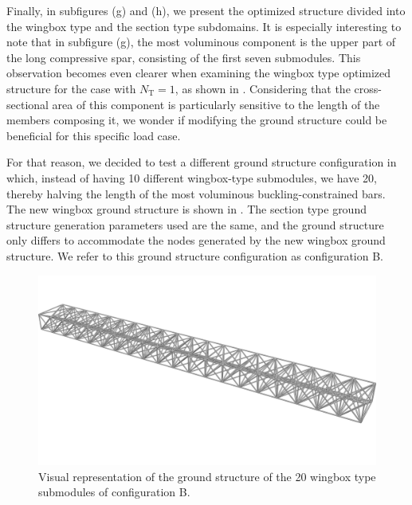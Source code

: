 Finally, in subfigures (g) and (h), we present the optimized structure divided into the wingbox type and the section type subdomains. It is especially interesting to note that in subfigure (g), the most voluminous component is the upper part of the long compressive spar, consisting of the first seven submodules. This observation becomes even clearer when examining the wingbox type optimized structure for the case with $N_\text{T}=1$, as shown in . Considering that the cross-sectional area of this component is particularly sensitive to the length of the members composing it, we wonder if modifying the ground structure could be beneficial for this specific load case.

For that reason, we decided to test a different ground structure configuration in which, instead of having 10 different wingbox-type submodules, we have 20, thereby halving the length of the most voluminous buckling-constrained bars. The new wingbox ground structure is shown in . The section type ground structure generation parameters used are the same, and the ground structure only differs to accommodate the nodes generated by the new wingbox ground structure. We refer to this ground structure configuration as configuration B.

\begin{figure}
    \centering
    \includegraphics[width=0.8\linewidth]{figures/07_aeronautic/00_NACA_gs_b/02_GS_c_iso.png}
        \caption{Visual representation of the ground structure of the 20 wingbox type submodules of configuration B.}
    \label{fig:07_gs_wingbox_b}
\end{figure}


